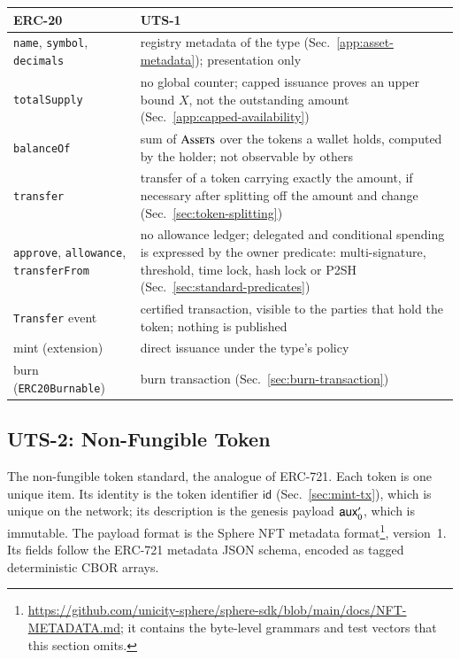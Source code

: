 \begin{longtable}{>{\raggedright\arraybackslash}p{4.2cm}>{\raggedright\arraybackslash}p{10.0cm}}
\textbf{ERC-20} & \textbf{UTS-1} \\
\hline
\endhead
\texttt{name}, \texttt{symbol}, \texttt{decimals} & registry metadata of the type (Sec.~\ref{app:asset-metadata}); presentation only \\
\texttt{totalSupply} & no global counter; capped issuance proves an upper bound $X$, not the outstanding amount (Sec.~\ref{app:capped-availability}) \\
\texttt{balanceOf} & sum of $\Call{Assets}{}$ over the tokens a wallet holds, computed by the holder; not observable by others \\
\texttt{transfer} & transfer of a token carrying exactly the amount, if necessary after splitting off the amount and change (Sec.~\ref{sec:token-splitting}) \\
\texttt{approve}, \texttt{allowance}, \texttt{transferFrom} & no allowance ledger; delegated and conditional spending is expressed by the owner predicate: multi-signature, threshold, time lock, hash lock or P2SH (Sec.~\ref{sec:standard-predicates}) \\
\texttt{Transfer} event & certified transaction, visible to the parties that hold the token; nothing is published \\
mint (extension) & direct issuance under the type's policy \\
burn (\texttt{ERC20Burnable}) & burn transaction (Sec.~\ref{sec:burn-transaction}) \\
\end{longtable}

\subsection{UTS-2: Non-Fungible Token}\label{app:uts-nft}

The non-fungible token standard, the analogue of ERC-721. Each token is one unique item. Its identity is the token identifier $\mathsf{id}$ (Sec.~\ref{sec:mint-tx}), which is unique on the network; its description is the genesis payload $\mathsf{aux}'_0$, which is immutable. The payload format is the Sphere NFT metadata format\footnote{\url{https://github.com/unicity-sphere/sphere-sdk/blob/main/docs/NFT-METADATA.md}; it contains the byte-level grammars and test vectors that this section omits.}, version~1. Its fields follow the ERC-721 metadata JSON schema, encoded as tagged deterministic CBOR arrays.


